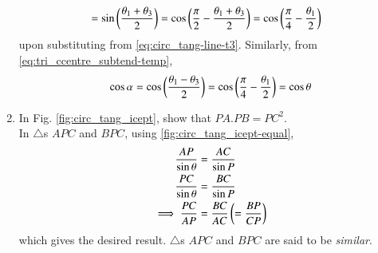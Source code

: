\begin{enumerate}[label=\thesection.\arabic*.,ref=\thesection.\theenumi]
\begin{align}
{			  } 
			  \\
			  &=
	    \sin \left(\frac{\theta_1+\theta_3}{2}\right)
	    =\cos\left(\frac{\pi}{2}-\frac{\theta_1+\theta_3}{2}\right)
	    =\cos\left(\frac{\pi}{4}-\frac{\theta_1}{2}\right)
  \end{align}
  upon substituting from 
		\eqref{eq:circ_tang-line-t3}.  Similarly, 	
		from
\eqref{eq:tri_ccentre_subtend-temp},
  \begin{align}
	  \cos \alpha = \cos \left(\frac{\theta_1-\theta_3}{2}  \right)
	    =\cos\left(\frac{\pi}{4}-\frac{\theta_1}{2}\right)
	  =\cos \theta
  \end{align}
%
\item
	In Fig. \ref{fig:circ_tang_icept}, show that $PA.PB = PC^2$.
\label{them:circ_tang_icept_prod}	
\\
\solution 
In $\triangle$s $APC$ and $BPC$, 
using
		\eqref{fig:circ_tang_icept-equal},	
  \begin{align}
	  \frac{AP}{\sin \theta} &= \frac{AC}{\sin P} 
	  \\
	  \frac{PC}{\sin \theta} &= \frac{BC}{\sin P} 
	  \\
	  \implies \frac{PC}{AP} &= \frac{BC}{AC}  \left(= \frac{BP}{CP}\right)
  \end{align}
  which gives the desired result.
$\triangle$s $APC$ and $BPC$ are said to be {\em similar}.
\iffalse
Using Theorem \ref{them:tang_icept_ang},
\begin{equation}
\triangle PAC \sim \triangle PBC \quad (AAA)
\end{equation}
 Hence,
%
\begin{align}
\frac{PA}{PC} &= \frac{PC}{PB} \\
\implies PA.PB &=PC^2
\end{align}
%
%
%
\item
	In Fig. \ref{fig:chord_tang_prod}, show that
\begin{equation}
	PA.PB = PC.PD
	\end{equation}
%
\begin{figure}[!ht]
	\begin{center}
		
		\resizebox{\columnwidth}{!}{}
	\end{center}
	\caption{$PA.PB = PC^2$.}
	\label{fig:chord_tang_prod}	
\end{figure}
\\
\solution From Theorem \ref{them:circ_tang_icept_prod}, if $PT$ be a tangent to the circle, 	
\begin{equation}
	PA.PB = PT^2 =PC.PD
	\end{equation}
	\fi
\end{enumerate}
